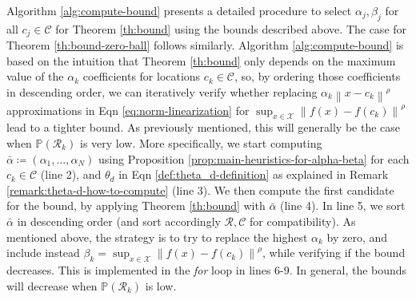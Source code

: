 \documentclass[11pt, a4paper, oneside,reqno]{amsart}
\theoremstyle{plain}
\def\prob{\mathbb{P}}
\newcommand{\norm}[1]{\left\lVert#1\right\rVert}
\def\sR{{\mathcal{R}}}
\def\sX{{\mathcal{X}}}
\def\bsR{{\bm{\mathcal{R}}}}
\def\bsC{{\bm{\mathcal{C}}}}
\begin{document}
    Algorithm \ref{alg:compute-bound} presents a detailed procedure to select $\alpha_j,\beta_j$ for all $c_j \in \bsC$ for Theorem \ref{th:bound} using the bounds described above. 
    The case for Theorem \ref{th:bound-zero-ball} follows similarly. 
    Algorithm \ref{alg:compute-bound} is based on the intuition that Theorem \ref{th:bound} only depends on the maximum value of the $\alpha_k$ coefficients for locations $c_k \in \bsC$, so, by ordering those coefficients in descending order, we can iteratively verify whether replacing $\alpha_k\norm{x-c_k}^\rho$ approximations in Eqn \eqref{eq:norm-linearization} for $\sup_{x \in \sX} \norm{f(x)-f(c_k)}^\rho$ lead to a tighter bound. As previously mentioned, this will generally be the case when $\prob(\sR_k)$ is very low. More specifically, we start computing $\bar\alpha \coloneqq (\alpha_1,...,\alpha_N)$ using Proposition \ref{prop:main-heuristics-for-alpha-beta} for each $c_k \in \bsC$ (line 2), and $\theta_d$ in Eqn \eqref{def:theta_d-definition} as explained in Remark \ref{remark:theta-d-how-to-compute} (line 3). We then compute the first candidate for the bound, by applying Theorem \ref{th:bound} with $\bar\alpha$ (line 4). In line 5, we sort $\bar\alpha$ in descending order (and sort accordingly $\bsR, \bsC$ for compatibility). As mentioned above, the strategy is to try to replace the highest $\alpha_k$ by zero, and include instead $\beta_k = \sup_{x \in \sX} \norm{f(x)-f(c_k)}^\rho$, while verifying if the bound decreases. This is implemented in the \emph{for} loop in lines 6-9. In general, the bounds will decrease when $\prob(\sR_k)$ is low.
\fi
{}
\end{document}
